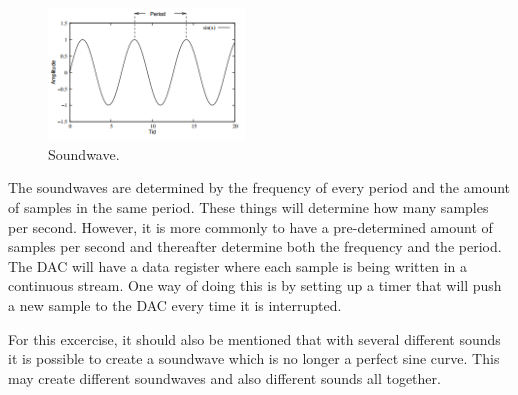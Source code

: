 \begin{figure}[hb]
  \centering
  \includegraphics[height=3.5cm]{images/soundwave}
  \caption[Soundwave]
   {Soundwave. \cite{TDT4528Compendium}}
\end{figure}

The soundwaves are determined by the frequency of every period and the amount of
samples in the same period. These things will determine how many samples per
second. However, it is more commonly to have a pre-determined amount of samples
per second and thereafter determine both the frequency and the period. The DAC
will have a data register where each sample is being written in a continuous
stream. One way of doing this is by setting up a timer that will push a new
sample to the DAC every time it is interrupted. \cite{TDT4528Compendium}

For this excercise, it should also be mentioned that with several different
sounds it is possible to create a soundwave which is no longer a perfect sine
curve. This may create different soundwaves and also different sounds all
together. \cite{science_bitch}
